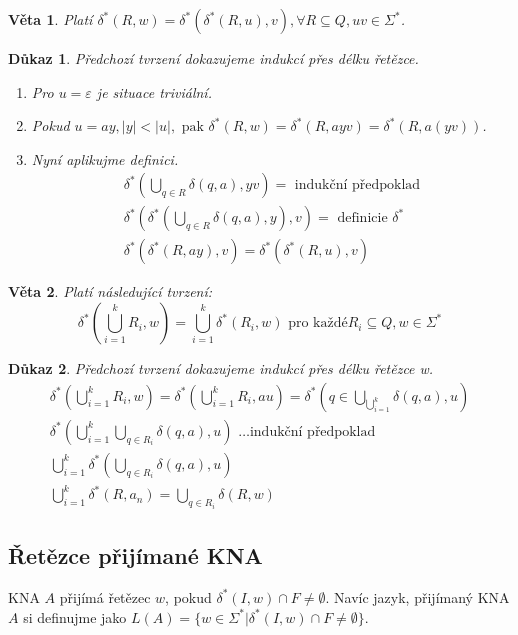 \documentclass[10pt, a4paper, titlepage]{article}
\theoremstyle{note}
\newtheorem{veta}{\textbf{Věta}}
\newtheorem{dukaz}{\textbf{Důkaz}}
\begin{document}
\begin{veta}
Platí $\delta^{*}(R,w) = \delta^{*}(\delta^{*}(R,u),v), \forall R \subseteq Q, uv \in \Sigma^{*}$.
\end{veta}
\begin{dukaz}
Předchozí tvrzení dokazujeme indukcí přes délku řetězce.

\begin{enumerate}
\item
Pro $u = \varepsilon$ je situace triviální.

\item
Pokud $u = ay, |y| < |u|,\text{ pak } \delta^{*}(R,w) = \delta^{*}(R,ayv) = \delta^{*}(R,a(yv))$.

\item
Nyní aplikujme definici.
\begin{gather*}
\delta^{*}(\bigcup\limits_{q \in R} \delta(q, a), yv) = \text{ indukční předpoklad} \\
\delta^{*}(\delta^{*}(\bigcup\limits_{q \in R} \delta(q, a), y), v) = \text{ definicie } \delta^{*} \\
\delta^{*}(\delta^{*}(R, ay), v) = \delta^{*}(\delta^{*}(R,u),v)
\end{gather*}
\end{enumerate}
\end{dukaz}

\begin{veta}
Platí následující tvrzení:
$$
\delta^{*}(\bigcup\limits_{i=1}^{k} R_{i},w) = \bigcup\limits_{i=1}^{k} \delta^{*}(R_{i},w) \text{ pro každé} R_{i} \subseteq Q, w \in \Sigma^{*}
$$
\end{veta}
\begin{dukaz}
Předchozí tvrzení dokazujeme indukcí přes délku řetězce w.
\begin{gather*}
\delta^{*}(\bigcup\limits_{i=1}^{k}R_{i},w) = \delta^{*}(\bigcup\limits_{i=1}^{k}R_{i},au) = \delta^{*}(q \in \bigcup\limits_{\bigcup_{i=1}^{k}} \delta(q, a), u) \\
\delta^{*}(\bigcup\limits_{i=1}^{k}\bigcup\limits_{q \in R_{i}} \delta(q,a),u) \text{ \ldots indukční předpoklad} \\
\bigcup\limits_{i=1}^{k} \delta^{*}(\bigcup\limits_{q \in R_{i}} \delta(q,a),u) \\
\bigcup\limits_{i=1}^{k} \delta^{*}(R,a_{n}) = \bigcup\limits_{q \in R_{i}} \delta(R,w)
\end{gather*}
\end{dukaz}

\subsection{Řetězce přijímané KNA}
KNA $A$ přijímá řetězec $w$, pokud $\delta^{*}(I,w) \cap F \neq \emptyset$.
Navíc jazyk, přijímaný KNA $A$ si definujme jako $L(A) = \lbrace w \in \Sigma^{*} | \delta^{*}(I,w) \cap F \neq \emptyset \rbrace$.
\end{document}
